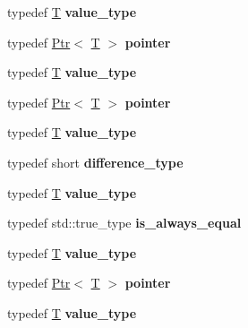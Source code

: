 \begin{DoxyCompactItemize}
typedef \mbox{\hyperlink{struct_t}{T}} {\bfseries value\+\_\+type}
\item 
\mbox{\label{struct_a_ab6399b214c0b32028df6a3c5b3ac5a16}} 
typedef \mbox{\hyperlink{struct_ptr}{Ptr}}$<$ \mbox{\hyperlink{struct_t}{T}} $>$ {\bfseries pointer}
\item 
\mbox{\label{struct_a_ae136ecf80b1597fcfaa23e26cbcdbb6c}} 
typedef \mbox{\hyperlink{struct_t}{T}} {\bfseries value\+\_\+type}
\item 
\mbox{\label{struct_a_ab6399b214c0b32028df6a3c5b3ac5a16}} 
typedef \mbox{\hyperlink{struct_ptr}{Ptr}}$<$ \mbox{\hyperlink{struct_t}{T}} $>$ {\bfseries pointer}
\item 
\mbox{\label{struct_a_ae136ecf80b1597fcfaa23e26cbcdbb6c}} 
typedef \mbox{\hyperlink{struct_t}{T}} {\bfseries value\+\_\+type}
\item 
\mbox{\label{struct_a_a416727916c0504cc625ad0661d83ea8a}} 
typedef short {\bfseries difference\+\_\+type}
\item 
\mbox{\label{struct_a_ae136ecf80b1597fcfaa23e26cbcdbb6c}} 
typedef \mbox{\hyperlink{struct_t}{T}} {\bfseries value\+\_\+type}
\item 
\mbox{\label{struct_a_a14a5ed01007f4ce19f062e47d9a7e5df}} 
typedef std\+::true\+\_\+type {\bfseries is\+\_\+always\+\_\+equal}
\item 
\mbox{\label{struct_a_ae136ecf80b1597fcfaa23e26cbcdbb6c}} 
typedef \mbox{\hyperlink{struct_t}{T}} {\bfseries value\+\_\+type}
\item 
\mbox{\label{struct_a_ab6399b214c0b32028df6a3c5b3ac5a16}} 
typedef \mbox{\hyperlink{struct_ptr}{Ptr}}$<$ \mbox{\hyperlink{struct_t}{T}} $>$ {\bfseries pointer}
\item 
\mbox{\label{struct_a_ae136ecf80b1597fcfaa23e26cbcdbb6c}} 
typedef \mbox{\hyperlink{struct_t}{T}} {\bfseries value\+\_\+type}
\item 
\mbox{\label{struct_a_acd4f1e468b0830c6c9d9a9754b9ec89a}} 

\end{DoxyCompactItemize}
